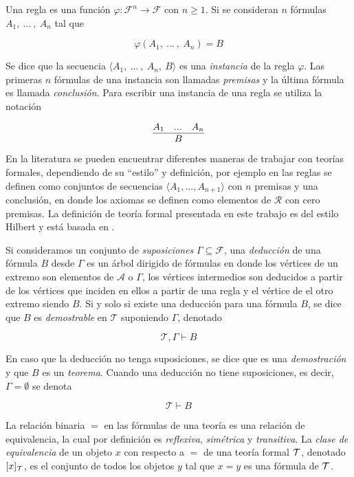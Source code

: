 Una regla es una función \( φ \colon \mathcal{F}^{n} \to \mathcal{F} \) con \( n \geq 1 \). Si se consideran \( n \) fórmulas \( A_{1},\ ...\ ,\ A_{n} \) tal que

\[ φ(A_{1},\ ...\ ,\ A_{n})=B \]

Se dice que la secuencia \( \langle A_{1},\ ...\ ,\ A_{n},\ B \rangle \) es una \emph{instancia} de la regla \( φ \). Las primeras \( n \) fórmulas de una instancia son llamadas \emph{premisas} y la última fórmula es llamada \emph{conclusión}. Para escribir una instancia de una regla se utiliza la notación

\[ \infer{B}{A_{1} & ... & A_{n}} \]

\begin{rem}
  En la literatura se pueden encuentrar diferentes maneras de trabajar con teorías formales, dependiendo de su ``estilo'' y definición, por ejemplo en \cite{Troelstra:ProofTheory} las reglas se definen como conjuntos de secuencias \( \langle A_{1},...,A_{n+1} \rangle \) con \( n \) premisas y una conclusión, en donde los axiomas se definen como elementos de \( \mathcal{R} \) con cero premisas. La definición de teoría formal presentada en este trabajo es del estilo Hilbert y está basada en \cite[pp.~69--70]{HindleySeldin:LambdaCalculusAndCombinators}.
\end{rem}

Si consideramos un conjunto de \emph{suposiciones} \( Γ \subseteq \mathcal{F} \), una \emph{deducción} de una fórmula \( B \) desde \( Γ \) es un árbol dirigido de fórmulas en donde los vértices de un extremo son elementos de \( \mathcal{A} \) o \( Γ \), los vértices intermedios son deducidos a partir de los vértices que inciden en ellos a partir de una regla y el vértice de el otro extremo siendo \( B \). Si y solo si existe una deducción para una fórmula \( B \), se dice que \( B \) es \emph{demostrable} en \( \mathcal{T} \) suponiendo \( Γ \), denotado

\[ \mathcal{T},Γ \vdash B \]

En caso que la deducción no tenga suposiciones, se dice que es una \emph{demostración} y que \( B \) es un \emph{teorema}. Cuando una deducción no tiene suposiciones, es decir, \( Γ = \emptyset \) se denota

\[ \mathcal{T} \vdash B \]

La relación binaria \( = \) en las fórmulas de una teoría es una relación de equivalencia, la cual por definición es \emph{reflexiva}, \emph{simétrica} y \emph{transitiva}. La \emph{clase de equivalencia} de un objeto \( x \) con respecto a \( = \) de una teoría formal \( \mathcal{T} \), denotado \( [x]_{\mathcal{T}} \), es el conjunto de todos los objetos \( y \) tal que \( x = y \) es una fórmula de \( \mathcal{T} \).


